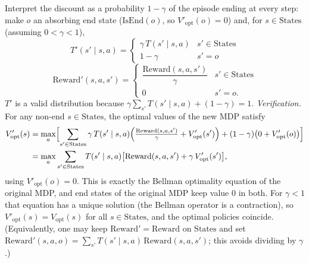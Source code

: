 \begin{solution}
Interpret the discount as a probability $1-\gamma$ of the episode ending at every step: make $o$ an absorbing end
state ($\text{IsEnd}(o)$, so $V'_{\text{opt}}(o)=0$) and, for $s\in\text{States}$ (assuming $0<\gamma<1$),
\[
T'(s'\mid s,a)=
\begin{cases}\gamma\,T(s'\mid s,a) & s'\in\text{States}\\ 1-\gamma & s'=o\end{cases}
\]
\[
\text{Reward}'(s,a,s')=
\begin{cases}\dfrac{\text{Reward}(s,a,s')}{\gamma} & s'\in\text{States}\\[4pt] 0 & s'=o.\end{cases}
\]
$T'$ is a valid distribution because $\gamma\sum_{s'}T(s'\mid s,a)+(1-\gamma)=1$.
\emph{Verification.} For any non-end $s\in\text{States}$, the optimal values of the new MDP satisfy
\begin{align*}
V'_{\text{opt}}(s)
&=\max_{a}\Bigl[\sum_{s'\in\text{States}}\gamma\,T(s'\mid s,a)\Bigl(\tfrac{\text{Reward}(s,a,s')}{\gamma}+V'_{\text{opt}}(s')\Bigr)
  +(1-\gamma)\bigl(0+V'_{\text{opt}}(o)\bigr)\Bigr]\\
&=\max_{a}\sum_{s'\in\text{States}}T(s'\mid s,a)\bigl[\text{Reward}(s,a,s')+\gamma\,V'_{\text{opt}}(s')\bigr],
\end{align*}
using $V'_{\text{opt}}(o)=0$. This is exactly the Bellman optimality equation of the original MDP, and end states
of the original MDP keep value $0$ in both. For $\gamma<1$ that equation has a unique solution (the Bellman
operator is a contraction), so $V'_{\text{opt}}(s)=V_{\text{opt}}(s)$ for all $s\in\text{States}$, and the optimal
policies coincide. (Equivalently, one may keep $\text{Reward}'=\text{Reward}$ on $\text{States}$ and set
$\text{Reward}'(s,a,o)=\sum_{s'}T(s'\mid s,a)\,\text{Reward}(s,a,s')$; this avoids dividing by $\gamma$.)
\end{solution}

